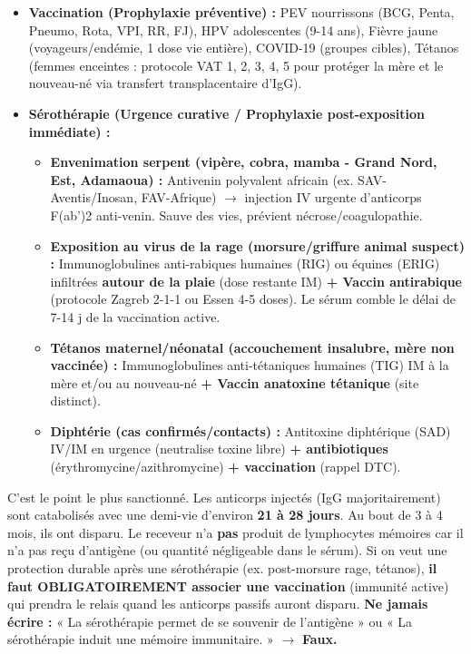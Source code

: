 \documentclass[11pt]{article}
\begin{document}
\begin{exemplebox}
\begin{itemize}
    \item \textbf{Vaccination (Prophylaxie préventive) :} PEV nourrissons (BCG, Penta, Pneumo, Rota, VPI, RR, FJ), HPV adolescentes (9-14 ans), Fièvre jaune (voyageurs/endémie, 1 dose vie entière), COVID-19 (groupes cibles), Tétanos (femmes enceintes : protocole VAT 1, 2, 3, 4, 5 pour protéger la mère et le nouveau-né via transfert transplacentaire d'IgG).
    \item \textbf{Sérothérapie (Urgence curative / Prophylaxie post-exposition immédiate) :}
    \begin{itemize}
        \item \textbf{Envenimation serpent (vipère, cobra, mamba - Grand Nord, Est, Adamaoua) :} Antivenin polyvalent africain (ex. SAV-Aventis/Inosan, FAV-Afrique) $\rightarrow$ injection IV urgente d'anticorps F(ab')2 anti-venin. Sauve des vies, prévient nécrose/coagulopathie.
        \item \textbf{Exposition au virus de la rage (morsure/griffure animal suspect) :} Immunoglobulines anti-rabiques humaines (RIG) ou équines (ERIG) infiltrées \textbf{autour de la plaie} (dose restante IM) \textbf{+ Vaccin antirabique} (protocole Zagreb 2-1-1 ou Essen 4-5 doses). Le sérum comble le délai de 7-14 j de la vaccination active.
        \item \textbf{Tétanos maternel/néonatal (accouchement insalubre, mère non vaccinée) :} Immunoglobulines anti-tétaniques humaines (TIG) IM à la mère et/ou au nouveau-né \textbf{+ Vaccin anatoxine tétanique} (site distinct).
        \item \textbf{Diphtérie (cas confirmés/contacts) :} Antitoxine diphtérique (SAD) IV/IM en urgence (neutralise toxine libre) \textbf{+ antibiotiques} (érythromycine/azithromycine) \textbf{+ vaccination} (rappel DTC).
    \end{itemize}
\end{itemize}
\end{exemplebox}

\begin{attention}
C'est le point le plus sanctionné. Les anticorps injectés (IgG majoritairement) sont catabolisés avec une demi-vie d'environ \textbf{21 à 28 jours}. Au bout de 3 à 4 mois, ils ont disparu. Le receveur n'a \textbf{pas} produit de lymphocytes mémoires car il n'a pas reçu d'antigène (ou quantité négligeable dans le sérum). Si on veut une protection durable après une sérothérapie (ex. post-morsure rage, tétanos), \textbf{il faut OBLIGATOIREMENT associer une vaccination} (immunité active) qui prendra le relais quand les anticorps passifs auront disparu. 
\textbf{Ne jamais écrire :} « La sérothérapie permet de se souvenir de l'antigène » ou « La sérothérapie induit une mémoire immunitaire. » $\rightarrow$ \textbf{Faux.}
\end{attention}
\end{document}
